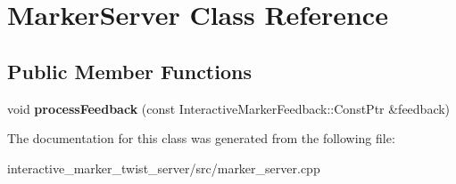 \hypertarget{classMarkerServer}{}\section{Marker\+Server Class Reference}
\label{classMarkerServer}
\subsection*{Public Member Functions}
\begin{DoxyCompactItemize}
\item 
\mbox{\label{classMarkerServer_afac4732f783a2f607daa7c90c1ab6fde}} 
void {\bfseries process\+Feedback} (const Interactive\+Marker\+Feedback\+::\+Const\+Ptr \&feedback)
\end{DoxyCompactItemize}


The documentation for this class was generated from the following file\+:\begin{DoxyCompactItemize}
\item 
interactive\+\_\+marker\+\_\+twist\+\_\+server/src/marker\+\_\+server.\+cpp\end{DoxyCompactItemize}
